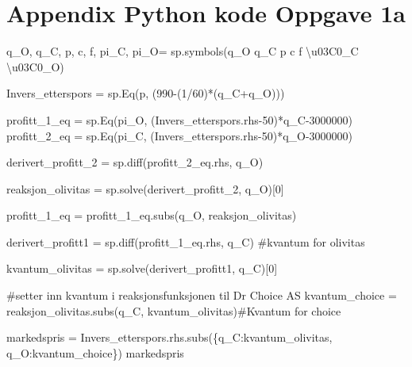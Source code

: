 \documentclass[
  12pt,
  a4paper,
  DIV=11,
  numbers=noendperiod]{scrartcl}
\newenvironment{Shaded}{\begin{snugshade}}{\end{snugshade}}
\newcommand{\CharTok}[1]{\textcolor[rgb]{0.13,0.47,0.30}{#1}}
\newcommand{\CommentTok}[1]{\textcolor[rgb]{0.37,0.37,0.37}{#1}}
\newcommand{\DecValTok}[1]{\textcolor[rgb]{0.68,0.00,0.00}{#1}}
\newcommand{\NormalTok}[1]{\textcolor[rgb]{0.00,0.23,0.31}{#1}}
\newcommand{\OperatorTok}[1]{\textcolor[rgb]{0.37,0.37,0.37}{#1}}
\newcommand{\StringTok}[1]{\textcolor[rgb]{0.13,0.47,0.30}{#1}}
\begin{document}
\clearpage

\section {Appendix Python kode Oppgave 1a}

\begin{Shaded}
\begin{Highlighting}[]
\NormalTok{q\_O, q\_C, p, c, f, pi\_C, pi\_O}\OperatorTok{=}\NormalTok{ sp.symbols(}\StringTok{\textquotesingle{}q\_O q\_C p c f }\CharTok{\textbackslash{}u03C0}\StringTok{\_C }\CharTok{\textbackslash{}u03C0}\StringTok{\_O\textquotesingle{}}\NormalTok{)}

\NormalTok{Invers\_etterspors }\OperatorTok{=}\NormalTok{ sp.Eq(p, (}\DecValTok{990}\OperatorTok{{-}}\NormalTok{(}\DecValTok{1}\OperatorTok{/}\DecValTok{60}\NormalTok{)}\OperatorTok{*}\NormalTok{(q\_C}\OperatorTok{+}\NormalTok{q\_O)))}


\NormalTok{profitt\_1\_eq }\OperatorTok{=}\NormalTok{ sp.Eq(pi\_O, (Invers\_etterspors.rhs}\OperatorTok{{-}}\DecValTok{50}\NormalTok{)}\OperatorTok{*}\NormalTok{q\_C}\OperatorTok{{-}}\DecValTok{3000000}\NormalTok{)}
\NormalTok{profitt\_2\_eq }\OperatorTok{=}\NormalTok{ sp.Eq(pi\_C, (Invers\_etterspors.rhs}\OperatorTok{{-}}\DecValTok{50}\NormalTok{)}\OperatorTok{*}\NormalTok{q\_O}\OperatorTok{{-}}\DecValTok{3000000}\NormalTok{)}


\NormalTok{derivert\_profitt\_2 }\OperatorTok{=}\NormalTok{ sp.diff(profitt\_2\_eq.rhs, q\_O)}

\NormalTok{reaksjon\_olivitas }\OperatorTok{=}\NormalTok{ sp.solve(derivert\_profitt\_2, q\_O)[}\DecValTok{0}\NormalTok{]}

\NormalTok{profitt\_1\_eq }\OperatorTok{=}\NormalTok{ profitt\_1\_eq.subs(q\_O, reaksjon\_olivitas)}

\NormalTok{derivert\_profitt1 }\OperatorTok{=}\NormalTok{ sp.diff(profitt\_1\_eq.rhs, q\_C) }\CommentTok{\#kvantum for olivitas}

\NormalTok{kvantum\_olivitas }\OperatorTok{=}\NormalTok{ sp.solve(derivert\_profitt1, q\_C)[}\DecValTok{0}\NormalTok{]}

\CommentTok{\#setter inn kvantum i reaksjonsfunksjonen til Dr Choice AS}
\NormalTok{kvantum\_choice }\OperatorTok{=}\NormalTok{ reaksjon\_olivitas.subs(q\_C, kvantum\_olivitas)}\CommentTok{\#Kvantum for choice}
\end{Highlighting}
\end{Shaded}

\begin{Shaded}
\begin{Highlighting}[]
\NormalTok{markedspris }\OperatorTok{=}\NormalTok{ Invers\_etterspors.rhs.subs(\{q\_C:kvantum\_olivitas, q\_O:kvantum\_choice\})}
\NormalTok{markedspris}
\end{Highlighting}
\end{Shaded}
\end{document}
